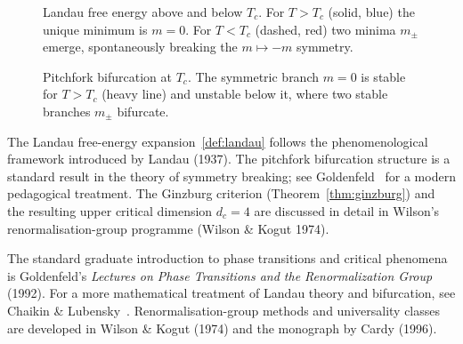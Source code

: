 
\begin{figure}[ht]
\centering
{}
\caption{Landau free energy above and below $T_c$.
         For $T>T_c$ (solid, blue) the unique minimum is $m=0$.
         For $T<T_c$ (dashed, red) two minima $m_\pm$ emerge,
         spontaneously breaking the $m\mapsto -m$ symmetry.}
\label{fig:landau-well}
\end{figure}

\begin{figure}[ht]
\centering
{}
\caption{Pitchfork bifurcation at $T_c$.
         The symmetric branch $m=0$ is stable for $T>T_c$ (heavy line)
         and unstable below it, where two stable branches $m_\pm$
         bifurcate.}
\label{fig:pitchfork}
\end{figure}

\begin{CitationAnchor}
  The Landau free-energy expansion~\eqref{def:landau} follows the
  phenomenological framework introduced by Landau (1937).
  The pitchfork bifurcation structure is a standard result in
  the theory of symmetry breaking; see Goldenfeld~\cite{goldenfeld1992}
  for a modern pedagogical treatment.
  The Ginzburg criterion (Theorem~\ref{thm:ginzburg}) and the
  resulting upper critical dimension $d_c = 4$ are discussed
  in detail in Wilson's renormalisation-group programme
  (Wilson \& Kogut 1974).
\end{CitationAnchor}

\begin{FurtherReading}
  The standard graduate introduction to phase transitions and
  critical phenomena is Goldenfeld's \textit{Lectures on Phase
  Transitions and the Renormalization Group} (1992).
  For a more mathematical treatment of Landau theory and
  bifurcation, see Chaikin \& Lubensky~\cite{chaikin1995}.
  Renormalisation-group methods and universality classes are
  developed in Wilson \& Kogut (1974) and the monograph by
  Cardy (1996).
\end{FurtherReading}

